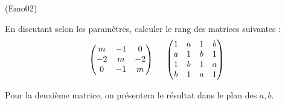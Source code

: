 \begin{tiny}(Emo02)\end{tiny} \label{num_Emo02}
En discutant selon les paramètres, calculer le rang des matrices suivantes :
\begin{displaymath}
\begin{pmatrix}
m & -1 & 0 \\
-2 & m & -2 \\
0 & -1 & m
\end{pmatrix}
 \hspace{0.5cm}
\begin{pmatrix}
1 & a & 1 & b \\
a & 1 & b & 1 \\
1 & b & 1 & a \\
b & 1 & a & 1
\end{pmatrix} 
\end{displaymath}

Pour la deuxième matrice, on présentera le résultat dans le plan des $a,b$.
